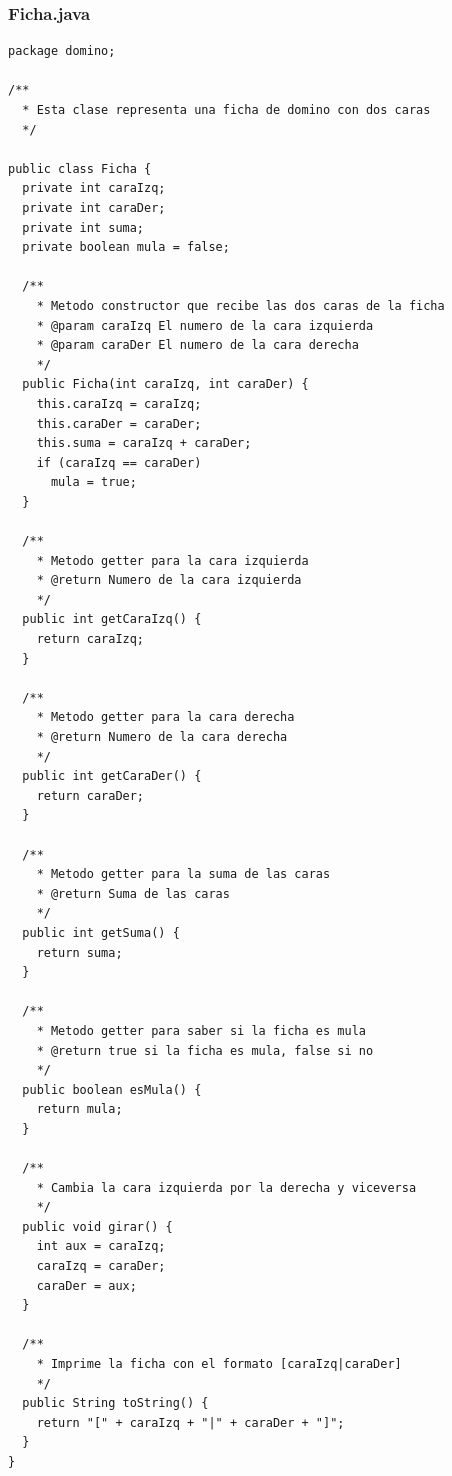 \documentclass[12pt]{article}
\begin{document}
  \subsubsection{Ficha.java}
  \begin{lstlisting}
package domino;

/**
  * Esta clase representa una ficha de domino con dos caras
  */

public class Ficha {
  private int caraIzq;
  private int caraDer;
  private int suma;
  private boolean mula = false;

  /**
    * Metodo constructor que recibe las dos caras de la ficha
    * @param caraIzq El numero de la cara izquierda
    * @param caraDer El numero de la cara derecha
    */
  public Ficha(int caraIzq, int caraDer) {
    this.caraIzq = caraIzq;
    this.caraDer = caraDer;
    this.suma = caraIzq + caraDer;
    if (caraIzq == caraDer)
      mula = true;
  }

  /**
    * Metodo getter para la cara izquierda
    * @return Numero de la cara izquierda
    */
  public int getCaraIzq() {
    return caraIzq;
  }

  /**
    * Metodo getter para la cara derecha
    * @return Numero de la cara derecha
    */
  public int getCaraDer() {
    return caraDer;
  }

  /**
    * Metodo getter para la suma de las caras
    * @return Suma de las caras
    */
  public int getSuma() {
    return suma;
  }

  /**
    * Metodo getter para saber si la ficha es mula
    * @return true si la ficha es mula, false si no
    */
  public boolean esMula() {
    return mula;
  }

  /**
    * Cambia la cara izquierda por la derecha y viceversa
    */
  public void girar() {
    int aux = caraIzq;
    caraIzq = caraDer;
    caraDer = aux;
  }

  /**
    * Imprime la ficha con el formato [caraIzq|caraDer]
    */
  public String toString() {
    return "[" + caraIzq + "|" + caraDer + "]";
  }
}
  \end{lstlisting}
\end{document}

